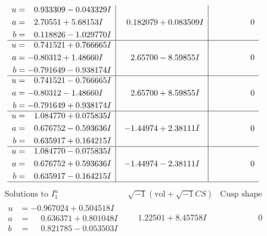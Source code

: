 \documentclass[1p]{elsarticle_modified}
\theoremstyle{definition}
\newcommand{\I}{\sqrt{-1}}
\begin{document}
$$\begin{array}{c|c|c}
\begin{aligned}
u &= \phantom{-}0.933309 - 0.043329 I \\
a &= \phantom{-}2.70551 + 5.68153 I \\
b &= \phantom{-}0.118826 - 1.029770 I\end{aligned}
 & \phantom{-}0.182079 + 0.083509 I & \phantom{-0.000000 } 0 \\ \hline\begin{aligned}
u &= \phantom{-}0.741521 + 0.766665 I \\
a &= -0.80312 + 1.48660 I \\
b &= -0.791649 - 0.938174 I\end{aligned}
 & \phantom{-}2.65700 - 8.59855 I & \phantom{-0.000000 } 0 \\ \hline\begin{aligned}
u &= \phantom{-}0.741521 - 0.766665 I \\
a &= -0.80312 - 1.48660 I \\
b &= -0.791649 + 0.938174 I\end{aligned}
 & \phantom{-}2.65700 + 8.59855 I & \phantom{-0.000000 } 0 \\ \hline\begin{aligned}
u &= \phantom{-}1.084770 + 0.075835 I \\
a &= \phantom{-}0.676752 - 0.593636 I \\
b &= \phantom{-}0.635917 + 0.164215 I\end{aligned}
 & -1.44974 + 2.38111 I & \phantom{-0.000000 } 0 \\ \hline\begin{aligned}
u &= \phantom{-}1.084770 - 0.075835 I \\
a &= \phantom{-}0.676752 + 0.593636 I \\
b &= \phantom{-}0.635917 - 0.164215 I\end{aligned}
 & -1.44974 - 2.38111 I & \phantom{-0.000000 } 0\\
 \hline 
 \end{array}$$\newpage$$\begin{array}{c|c|c}  
\text{Solutions to }I^u_{1}& \I (\text{vol} + \sqrt{-1}CS) & \text{Cusp shape}\\
 \hline 
\begin{aligned}
u &= -0.967024 + 0.504518 I \\
a &= \phantom{-}0.636371 + 0.801048 I \\
b &= \phantom{-}0.821785 - 0.053503 I\end{aligned}
 & \phantom{-}1.22501 + 8.45758 I & \phantom{-0.000000 } 0 \\ \hline\begin{aligned}

\end{aligned}
\end{array}$$
\end{document}
